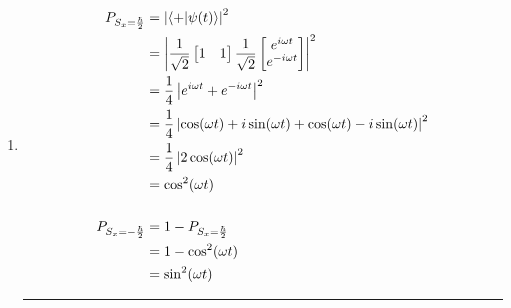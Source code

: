 \begin{solution}
\begin{enumerate}
        \vspace{1em}\hrule

        \item \[\begin{aligned}
        P_{S_x=\frac{\hbar}{2}} &= \left| \braket{+}{\psi(t)} \right|^2 \\
        &= \left| \frac{1}{\sqrt{2}} \begin{bmatrix} 1 & 1 \end{bmatrix} \frac{1}{\sqrt{2}} \begin{bmatrix} e^{i\omega t} \\ e^{-i\omega t} \end{bmatrix} \right|^2 \\
        &= \frac{1}{4} \left| e^{i\omega t} + e^{-i\omega t} \right|^2 \\
        &= \frac{1}{4} \left| \cos(\omega t) + i\sin(\omega t) + \cos(\omega t) - i\sin(\omega t) \right|^2 \\
        &= \frac{1}{4} \left| 2\cos(\omega t) \right|^2 \\
        &= \cos^2(\omega t) \\[1.5em]
        P_{S_x=-\frac{\hbar}{2}} &= 1 - P_{S_x=\frac{\hbar}{2}} \\
        &= 1 - \cos^2(\omega t) \\
        &= \sin^2(\omega t)
        \end{aligned}\]

        \hrule


\end{enumerate}
\end{solution}
